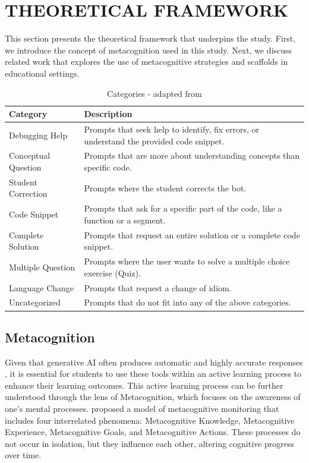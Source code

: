 \documentclass[a4paper,twoside]{article}
\begin{document}
\section{\uppercase{Theoretical Framework}}

This section presents the theoretical framework that underpins the study. First,
we introduce the concept of metacognition used in this study. Next, we discuss
related work that explores the use of metacognitive strategies and scaffolds
in educational settings.

\begin{table}[htbp]
  \caption{Categories - adapted from \cite{Ghimire24}}
  \begin{center}
    \renewcommand{\arraystretch}{1.6} %
    \begin{tabular}{p{3cm} p{12cm}} %
      \hline
      \textbf{Category} & \textbf{Description} \\
      \hline
      Debugging Help & Prompts that seek help to identify, fix errors, or understand the provided code snippet. \\
      Conceptual Question & Prompts that are more about understanding concepts than specific code. \\
      Student Correction & Prompts where the student corrects the bot. \\
      Code Snippet & Prompts that ask for a specific part of the code, like a function or a segment. \\
      Complete Solution & Prompts that request an entire solution or a complete code snippet. \\
      Multiple Question & Prompts where the user wants to solve a multiple choice exercise (Quiz). \\
      Language Change & Prompts that request a change of idiom. \\
      Uncategorized & Prompts that do not fit into any of the above categories. \\
      \hline
    \end{tabular}
    \label{tab:categories}
  \end{center}
\end{table}

\subsection{Metacognition}

Given that generative AI often produces automatic and highly accurate responses
\citep{Puryear22}, it is essential for students to use these tools within an
active learning process to enhance their learning outcomes. This active
learning process can be further understood through the lens of Metacognition, which
focuses on the awareness of one’s mental processes. \cite{flavell79} proposed a
model of metacognitive monitoring that includes four interrelated phenomena:
Metacognitive Knowledge, Metacognitive Experience, Metacognitive Goals, and
Metacognitive Actions. These processes do not occur in isolation, but they
influence each other, altering cognitive progress over time.
\end{document}
